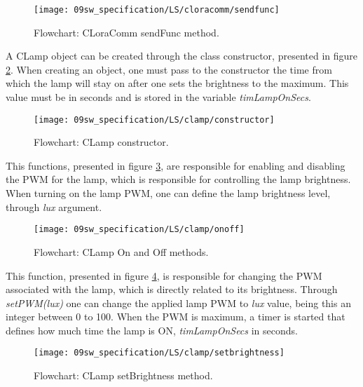 \begin{figure}[H]
	\centering
	\texttt{[image: 09sw\_specification/LS/cloracomm/sendfunc]}
	\caption{Flowchart: CLoraComm sendFunc method.}
	\label{fig:CLoraCommsendfunc}
\end{figure}


\clearpage
{}

A CLamp object can be created through the class constructor, presented in figure \ref{fig:CLampconstructor}. When creating an object, one must pass to the constructor the time from which the lamp will stay on after one sets the brightness to the maximum. This value must be in seconds and is stored in the variable \textit{timLampOnSecs}.

\begin{figure}[H]
	\centering	
	\texttt{[image: 09sw\_specification/LS/clamp/constructor]}
	\caption{Flowchart: CLamp constructor.}
	\label{fig:CLampconstructor}
\end{figure}

This functions, presented in figure \ref{fig:CLamponoff}, are responsible for enabling and disabling the PWM for the lamp, which is responsible for controlling the lamp brightness. When turning on the lamp PWM, one can define the lamp brightness level, through \textit{lux} argument.

\begin{figure}[H]
	\centering	
	\texttt{[image: 09sw\_specification/LS/clamp/onoff]}
	\caption{Flowchart: CLamp On and Off methods.}
	\label{fig:CLamponoff}
\end{figure}

\clearpage
This function, presented in figure \ref{fig:CLampsetBrightness}, is responsible for changing the PWM associated with the lamp, which is directly related to its brightness. Through \textit{setPWM(lux)} one can change the applied lamp PWM to \textit{lux} value, being this an integer between 0 to 100. When the PWM is maximum, a timer is started that defines how much time the lamp is ON, \textit{timLampOnSecs} in seconds.

\begin{figure}[H]
	\centering	
	\texttt{[image: 09sw\_specification/LS/clamp/setbrightness]}
	\caption{Flowchart: CLamp setBrightness method.}
	\label{fig:CLampsetBrightness}
\end{figure}

